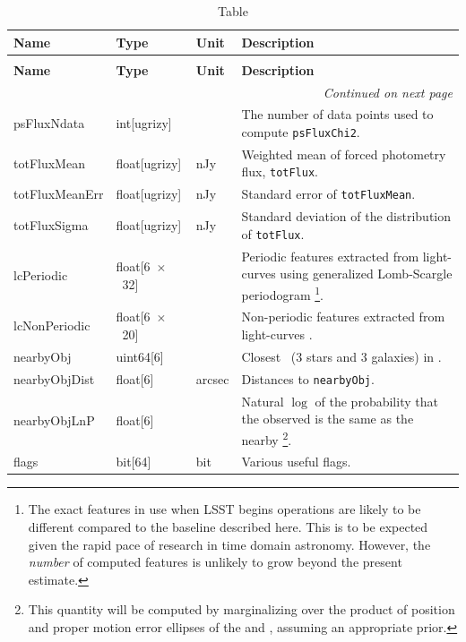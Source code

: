 \documentclass[SE,lsstdraft,toc]{lsstdoc}
\newcommand\x         {\hbox{$\times$}}
\newenvironment{schema}[3]{%
\setlength\LTleft{0pt}
\setlength\LTright{\fill}
\begin{longtable}{p{0.2\textwidth}p{0.14\textwidth}p{0.14\textwidth}p{0.41\textwidth}}

\caption[#1]{#2\label{#3}}\\

\hline \textbf{Name} & \textbf{Type} & \textbf{Unit} & \textbf{Description}\\ \hline
\endfirsthead

\caption[#1]{#2}\\

\hline \textbf{Name} & \textbf{Type} & \textbf{Unit} & \textbf{Description}\\ \hline
\endhead

\hline \multicolumn{4}{r}{\emph{Continued on next page}} \\
\endfoot

\hline\hline
\endlastfoot
}{%
\hline
\end{longtable}
}
\begin{document}
\begin{schema}{\DIAObject Table}{\DIAObject Table}{tbl:diaobjectTable}
psFluxNdata & int[ugrizy] & ~ & The number of data points used to compute \texttt{psFluxChi2}. \\

totFluxMean & float[ugrizy] & nJy & Weighted mean of forced photometry flux, \texttt{totFlux}.\\

totFluxMeanErr & float[ugrizy] & nJy & Standard error of \texttt{totFluxMean}. \\

totFluxSigma & float[ugrizy] & nJy & Standard deviation of the distribution of \texttt{totFlux}. \\





lcPeriodic & float[6~\x~32] & ~ & Periodic features extracted from \newtext{\DIASource} light-curves using generalized Lomb-Scargle periodogram \citep[Table~4,][]{2011ApJ...733...10R}\footnote{The exact features in use when LSST begins operations are likely to be different compared to the baseline described here. This is to be expected given the rapid pace of research in time domain astronomy. However, the \emph{number} of computed features is unlikely to grow beyond the present estimate.}. \\

lcNonPeriodic & float[6~\x~20] & ~ & Non-periodic features extracted from \newtext{\DIASource} light-curves \citep[Table~5,][]{2011ApJ...733...10R}. \\

nearbyObj   & uint64[6] & ~ & Closest \Objects\ (3 stars and 3 galaxies) in \DR.\\

nearbyObjDist   & float[6] & arcsec & Distances to \texttt{nearbyObj}. \\

nearbyObjLnP   & float[6] & ~ &  Natural $\log$ of the probability that the observed \DIAObject is the same as the nearby \Object\footnote{This quantity will be computed by marginalizing over the product of position and proper motion error ellipses of the \Object and \DIAObject, assuming an appropriate prior.}. \\

flags & bit[64] & bit & Various useful flags. \\

\end{schema}
\end{document}
